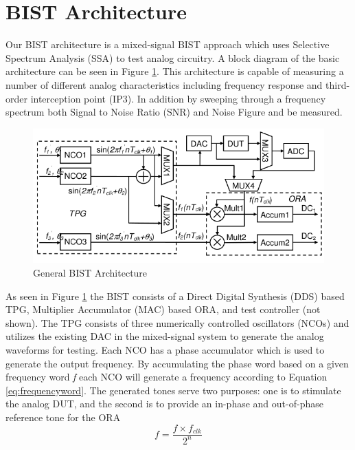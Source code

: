 \documentclass[12pt]{report}
\begin{document}
\section{BIST Architecture}
Our BIST architecture is a mixed-signal BIST approach which uses Selective Spectrum Analysis (SSA) to test analog circuitry.  A block diagram of the basic architecture can be seen in Figure \ref{fig:bist-ssa}.  This architecture is capable of measuring a number of different analog characteristics including frequency response and third-order interception point (IP3)\cite{basessa}.  In addition by sweeping through a frequency spectrum both Signal to Noise Ratio (SNR) and Noise Figure\cite{noisefigure} and be measured.
\begin{figure}
	\begin{center}
		\includegraphics[scale=.5]{images/bist-ssa-architecture}
	\end{center}
	\caption{General BIST Architecture\cite{testtime}}
	\label{fig:bist-ssa}
\end{figure}
As seen in Figure \ref{fig:bist-ssa} the BIST consists of a Direct Digital Synthesis (DDS) based TPG, Multiplier Accumulator (MAC) based ORA, and test controller (not shown).  The TPG consists of three numerically controlled oscillators (NCOs) and utilizes the existing DAC in the mixed-signal system to generate the analog waveforms for testing\cite{testtime}.  Each NCO has a phase accumulator which is used to generate the output frequency\cite{basessa}.  By accumulating the phase word based on a given frequency word \textit{f} each NCO will generate a frequency according to Equation \ref{eq:frequencyword}\cite{testtime}.  The generated tones serve two purposes: one is to stimulate the analog DUT, and the second is to provide an in-phase and out-of-phase reference tone for the ORA\cite{testtime}
\begin{equation}
	f = \frac{f \times f_{clk}}{2^{n}}
	\label{eq:frequencyword}
\end{equation}
\end{document}
